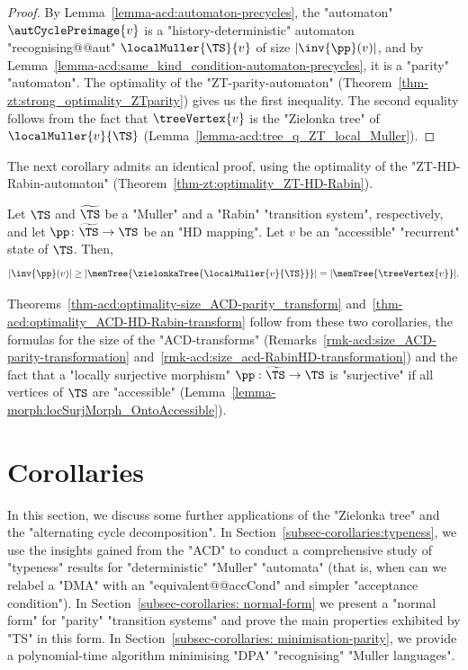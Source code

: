 \documentclass[10pt,a4paper]{amsart}
\begin{document}
\begin{proof}
	By Lemma~\ref{lemma-acd:automaton-precycles}, the "automaton" $\autCyclePreimage{v}$ is a "history-deterministic" automaton "recognising@@aut" $\localMuller{\TS}{v}$ of size $|\inv{\pp}(v)|$, and by Lemma~\ref{lemma-acd:same_kind_condition-automaton-precycles}, it is a "parity" "automaton". The optimality of the "ZT-parity-automaton" (Theorem~\ref{thm-zt:strong_optimality_ZTparity}) gives us the first inequality. The second equality follows from the fact that $\treeVertex{v}$ is the "Zielonka tree" of $\localMuller{v}{\TS}$ (Lemma~\ref{lemma-acd:tree_q_ZT_local_Muller}).
\end{proof}

The next corollary admits an identical proof, using the optimality of the "ZT-HD-Rabin-automaton" (Theorem~\ref{thm-zt:optimality_ZT-HD-Rabin}).
\begin{corollary}
	Let $\TS$ and $\widetilde{\TS}$ be a "Muller" and a "Rabin" "transition system", respectively, and let $\pp \colon \widetilde{\TS} \to \TS$ be an "HD mapping". Let $v$ be an "accessible" "recurrent" state of $\TS$. Then,
	\[ |\inv{\pp}(v)| \geq |\memTree{\zielonkaTree{\localMuller{v}{\TS}}}| = |\memTree{\treeVertex{v}}|.\]
\end{corollary}

Theorems~\ref{thm-acd:optimality-size_ACD-parity_transform} and~\ref{thm-acd:optimality_ACD-HD-Rabin-transform} follow from these two corollaries, the formulas for the size of the "ACD-transforms" (Remarks~\ref{rmk-acd:size_ACD-parity-transformation} and~\ref{rmk-acd:size_acd-RabinHD-transformation}) and the fact that a "locally surjective morphism" $\pp:\widetilde{\TS} \to \TS$  is "surjective" if all vertices of $\TS$ are "accessible" (Lemma~\ref{lemma-morph:locSurjMorph_OntoAccessible}).


 	
	\section{Corollaries}\label{section:corollaries}
	In this section, we discuss some further applications of the "Zielonka tree" and the "alternating cycle decomposition".
In Section~\ref{subsec-corollaries:typeness}, we use the insights gained from the "ACD" to conduct a comprehensive study of "typeness" results for "deterministic" "Muller" "automata" (that is, when can we relabel a "DMA" with an "equivalent@@accCond" and simpler "acceptance condition").
In Section~\ref{subsec-corollaries: normal-form} we present a "normal form" for "parity" "transition systems" and prove the main properties exhibited by "TS" in this form.
In Section~\ref{subsec-corollaries: minimisation-parity}, we provide a polynomial-time algorithm minimising "DPA" "recognising" "Muller languages".
\end{document}

